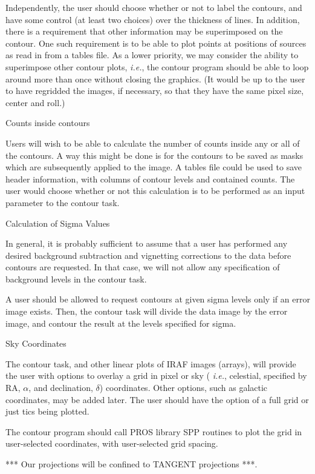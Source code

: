Independently, the user should choose whether or not to label the
contours, and have some control (at least two choices) over the
thickness of lines.  In addition, there is a requirement that
other information may be superimposed on the contour.  One such
requirement
is to be able to plot points at positions of sources as read in from
a tables file.  As a lower priority, we may consider the ability to superimpose
other contour plots, {\it i.e.}, the contour program should be able to
loop around more than once without closing the graphics. (It would be
up to the user to have regridded the images, if necessary, so that
they
have the same pixel size, center and roll.)


\@{Counts inside contours}

Users will wish to be able to calculate the number of counts inside
any or all of the contours. A way this might be done is for the
contours to be saved as masks which are subsequently applied to the
image.  A tables file could be used to save header information, with
columns of contour levels and contained counts.  The user would choose
whether or not this calculation is to be performed as an input
parameter to the contour task.

\@{Calculation of Sigma Values}

In general, it is probably sufficient to assume that a user has
performed
any desired background subtraction and vignetting corrections to the
data
before contours are requested. In that case, we will not allow any
specification of background levels in the contour task.

A user should be allowed to request contours at given sigma levels
only if an error image exists.
Then, the contour task will
divide the data image by the error image, and contour the result at the
levels specified for sigma.

\@{Sky Coordinates}

The contour task, and other linear plots of IRAF images (arrays),
will provide the user with options to overlay a grid in pixel or sky ({\it
i.e.},
celestial, specified by RA, $\alpha$, and declination, $\delta$)
coordinates.  Other options, such as galactic coordinates,
may be added later.  The user should have the option of a full grid or
just tics being plotted.

The contour program should call PROS library SPP routines to plot the
grid in user-selected coordinates, with user-selected grid spacing.

*** Our projections will be confined to TANGENT projections ***.

